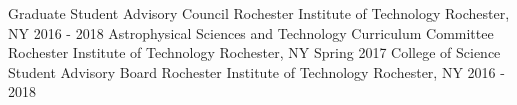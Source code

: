 \begin{cvhonors}
  \cvhonor
    {Graduate Student Advisory Council}
    {Rochester Institute of Technology}
    {Rochester, NY}
    {2016 - 2018}
  \cvhonor
    {Astrophysical Sciences and Technology Curriculum Committee}
    {Rochester Institute of Technology}
    {Rochester, NY}
    {Spring 2017}
  \cvhonor
    {College of Science Student Advisory Board}
    {Rochester Institute of Technology}
    {Rochester, NY}
    {2016 - 2018}

\end{cvhonors}
